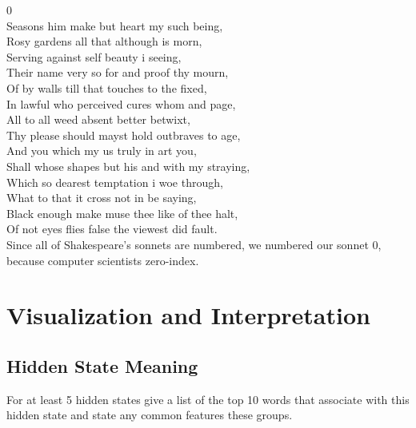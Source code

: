 0\\
\noindent Seasons him make but heart my such being,\\
Rosy gardens all that although is morn,\\
Serving against self beauty i seeing,\\
Their name very so for and proof thy mourn,\\
Of by walls till that touches to the fixed,\\
In lawful who perceived cures whom and page,\\
All to all weed absent better betwixt,\\
Thy please should mayst hold outbraves to age,\\
And you which my us truly in art you,\\
Shall whose shapes but his and with my straying,\\
Which so dearest temptation i woe through,\\
What to that it cross not in be saying,\\
Black enough make muse thee like of thee halt,\\
Of not eyes flies false the viewest did fault.\\

Since all of Shakespeare's sonnets are numbered, we numbered our sonnet 0, because computer scientists zero-index.


\section{Visualization and Interpretation}
\subsection{Hidden State Meaning}
For at least 5 hidden states give a list of the top 10 words that associate with this hidden state and state any common features these groups.

